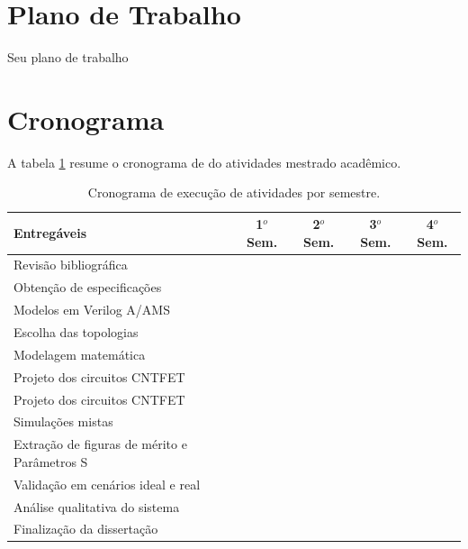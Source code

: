 \documentclass[article,12pt, a4paper]{abntex2}
\begin{document}
\section{Plano de Trabalho}
Seu plano de trabalho

\section{Cronograma}
A tabela \ref{tab:cronograma} resume o cronograma de do atividades mestrado acadêmico.

\begin{table}[H]
	\begin{center}
		\begin{tabular}{|l|c|c|c|c|}
			\hline
			\textbf{Entregáveis} & \textbf{1$^o$ Sem.} & \textbf{2$^o$ Sem.}& \textbf{3$^o$ Sem.}& \textbf{4$^o$ Sem.}\\\hline
			Revisão bibliográfica & \cellcolor{gray!50}    &   &  &  \\\hline
			Obtenção de especificações  &  \cellcolor{gray!50}  &   &  &\\\hline
			Modelos em Verilog A/AMS &  \cellcolor{gray!50}  &   &  &\\\hline
			Escolha das topologias &  \cellcolor{gray!50} &  \cellcolor{gray!50} & & \\\hline
			Modelagem matemática & &  \cellcolor{gray!50} & & \\\hline
			Projeto dos circuitos CNTFET &    & \cellcolor{gray!50}  &  &\\\hline
			Projeto dos circuitos CNTFET &    &  \cellcolor{gray!50} & \cellcolor{gray!50} & \\\hline
			Simulações mistas &    &   & \cellcolor{gray!50} &\\\hline
			Extração de figuras de mérito  e Parâmetros S&    &   & \cellcolor{gray!50} &\\\hline
			Validação em cenários ideal e real &    &   & \cellcolor{gray!50} & \cellcolor{gray!50}\\\hline
			Análise qualitativa do sistema &    &   &  & \cellcolor{gray!50}\\\hline
			Finalização da dissertação  &    &   &  & \cellcolor{gray!50}\\\hline
			
		\end{tabular}
		\caption{Cronograma de execução de atividades por semestre.}
		\label{tab:cronograma}
	\end{center}
\end{table}



%
\end{document}
